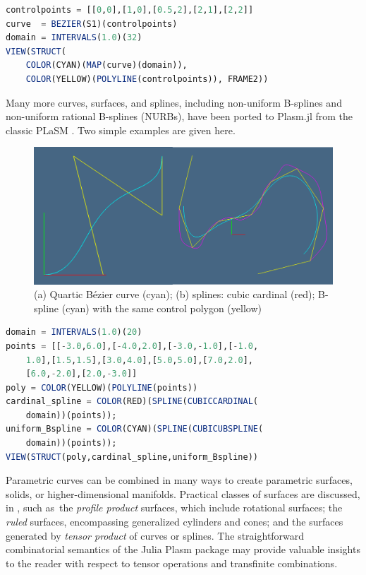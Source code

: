 \documentclass{juliacon}
\begin{document}
\vspace{-5mm}
\begin{lstlisting}[language = Julia,numbers=none,label={lst:exmpl10},
caption={Specialized transfinite {\tt Bézier mapping}. Five control points, hence a quartic Bezier curve. Unit interval domain.}
]
controlpoints = [[0,0],[1,0],[0.5,2],[2,1],[2,2]]
curve  = BEZIER(S1)(controlpoints)
domain = INTERVALS(1.0)(32)
VIEW(STRUCT(
	COLOR(CYAN)(MAP(curve)(domain)), 
	COLOR(YELLOW)(POLYLINE(controlpoints)), FRAME2)) 
\end{lstlisting}

Many more curves, surfaces, and splines, including non-uniform B-splines and non-uniform rational B-splines (NURBs), have been ported to Plasm.jl from the classic PLaSM \cite{Paoluzzi2003a}. Two simple examples are given here. 

\begin{figure}[htbp] %
   \centering
   \includegraphics[width=\linewidth]{figs/splinecurves} 
   \caption{(a) Quartic Bézier curve (cyan); (b) splines: cubic cardinal (red); B-spline (cyan) with the same control polygon (yellow)}
   \label{fig:splinecurves}
\end{figure}

\begin{lstlisting}[language = Julia,numbers=none,label={lst:exmpl10},
caption={Spline cardinal and uniform B-spline.}
]
domain = INTERVALS(1.0)(20)
points = [[-3.0,6.0],[-4.0,2.0],[-3.0,-1.0],[-1.0,
	1.0],[1.5,1.5],[3.0,4.0],[5.0,5.0],[7.0,2.0],
	[6.0,-2.0],[2.0,-3.0]]
poly = COLOR(YELLOW)(POLYLINE(points))
cardinal_spline = COLOR(RED)(SPLINE(CUBICCARDINAL(
	domain))(points));
uniform_Bspline = COLOR(CYAN)(SPLINE(CUBICUBSPLINE(
	domain))(points));
VIEW(STRUCT(poly,cardinal_spline,uniform_Bspline))
\end{lstlisting}

Parametric curves can be combined in many ways to create parametric surfaces, solids, or higher-dimensional manifolds. 
Practical classes of surfaces are discussed, in \cite{Paoluzzi2003a}, such as~the \emph{profile product} surfaces, which include rotational surfaces; the \emph{ruled} surfaces, encompassing generalized cylinders and cones; and the surfaces generated by \emph{tensor product} of curves or splines. 
The straightforward combinatorial semantics of the Julia Plasm package may provide valuable insights to the reader with respect to tensor operations and transfinite combinations.
\end{document}
